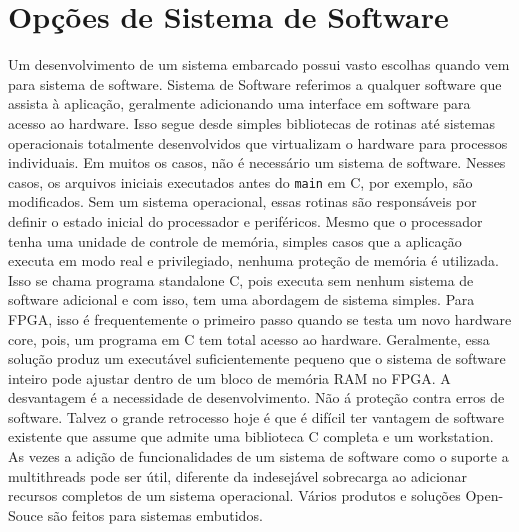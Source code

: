 \section{Opções de Sistema de Software}
Um desenvolvimento de um sistema embarcado possui vasto escolhas quando vem para sistema de software. Sistema de Software referimos a qualquer software que assista à aplicação, geralmente adicionando uma interface em software para acesso ao hardware. Isso segue desde simples bibliotecas de rotinas até sistemas operacionais totalmente desenvolvidos que virtualizam o hardware para processos individuais. Em muitos os casos, não é necessário um sistema de software. Nesses casos, os arquivos iniciais executados antes do \texttt{main} em C, por exemplo, são modificados. Sem um sistema operacional, essas rotinas são responsáveis por definir o estado inicial do processador e periféricos. Mesmo que o processador tenha uma unidade de controle de memória, simples casos que a aplicação executa em modo real e privilegiado, nenhuma proteção de memória é utilizada. Isso se chama programa standalone C, pois executa sem nenhum sistema de software adicional e com isso, tem uma abordagem de sistema simples. 
Para FPGA, isso é frequentemente o primeiro passo quando se testa um novo hardware core, pois, um programa em C tem total acesso ao hardware. Geralmente, essa solução produz um executável suficientemente pequeno que o sistema de software inteiro pode ajustar dentro de um bloco de memória RAM no FPGA. A desvantagem é a necessidade de desenvolvimento. Não á proteção contra erros de software. Talvez o grande retrocesso hoje é que é difícil ter vantagem de software existente que assume que admite uma biblioteca C completa e um workstation. As vezes a adição de funcionalidades de um sistema de software como o suporte a multithreads pode ser útil, diferente da indesejável sobrecarga ao adicionar recursos completos de um sistema operacional. Vários produtos e soluções Open-Souce são feitos para sistemas embutidos.
